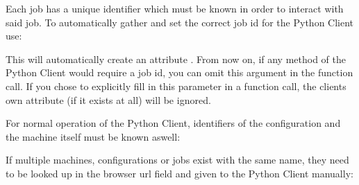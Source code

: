 \documentclass[letterpaper,10pt,english,openany,oneside]{sphinxmanual}
\begin{document}
Each job has a unique identifier which must be known in order to interact with said job.
To automatically gather and set the correct job id for the Python Client use:

\begin{sphinxVerbatim}[commandchars=\\\{\}]
 
\end{sphinxVerbatim}

This will automatically create an attribute . From now on, if any method
of the Python Client would require a job id, you can omit this argument in the
function call. If you chose to explicitly fill in this parameter in a function
call, the clients own attribute (if it exists at all) will be ignored.

For normal operation of the Python Client, identifiers of the configuration and
the machine itself must be known aswell:

\begin{sphinxVerbatim}[commandchars=\\\{\}]
 
 
\end{sphinxVerbatim}

If multiple machines, configurations or jobs exist with the same name, they need
to be looked up in the browser url field and given to the Python Client manually:

\begin{sphinxVerbatim}[commandchars=\\\{\}]
  
  
  
\end{sphinxVerbatim}
\end{document}
